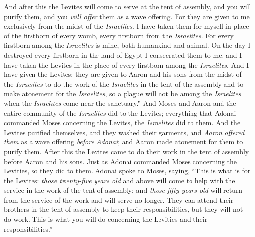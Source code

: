 \begin{biblechapter}
\verse And after this the Levites will come to serve at the tent of assembly, and you will purify them, and you \textit{will offer} them as a wave offering.
\verse For they are given to me exclusively from the midst of the \textit{Israelites}. I have taken them for myself in place of the firstborn of every womb, every firstborn from the \textit{Israelites}.
\verse For every firstborn among the \textit{Israelites} is mine, both humankind and animal. On the day I destroyed every firstborn in the land of Egypt I consecrated them to me,
\verse and I have taken the Levites in the place of every firstborn among the \textit{Israelites}.
\verse And I have given the Levites; they are given to Aaron and his sons from the midst of the \textit{Israelites} to do the work of the \textit{Israelites} in the tent of the assembly and to make atonement for the \textit{Israelites}, so a plague will not be among the \textit{Israelites} when the \textit{Israelites} come near the sanctuary.”
\verse And Moses and Aaron and the entire community of the \textit{Israelites} did to the Levites; everything that Adonai commanded Moses concerning the Levites, the \textit{Israelites} did to them.
\verse And the Levites purified themselves, and they washed their garments, and \textit{Aaron offered them} as a wave offering \textit{before Adonai}; and Aaron made atonement for them to purify them.
\verse After this the Levites came to do their work in the tent of assembly before Aaron and his sons. Just as Adonai commanded Moses concerning the Levities, so they did to them.
\verse Adonai spoke to Moses, saying,
\verse “This is what is for the Levites: \textit{those twenty-five years old} and above will come to help with the service in the work of the tent of assembly;
\verse and \textit{those fifty years old} will return from the service of the work and will serve no longer.
\verse They can attend their brothers in the tent of assembly to keep their responsibilities, but they will not do work. This is what you will do concerning the Levities and their responsibilities.”
\end{biblechapter}

